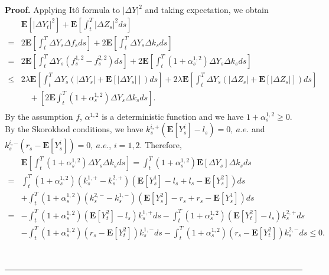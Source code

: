 \documentclass[10pt]{article}%
\numberwithin{equation}{section}
\newenvironment{proof}[1][Proof]{\noindent \textbf{#1.} }{\  \rule{0.5em}{0.5em}}
\def \E{\mathbf{E}}
\begin{document}
\begin{proof}
    Applying It\^o formula to $\left|\Delta Y \right|^2$ and taking expectation, we obtain 
    \begin{equation}
    \begin{split}
      & \mathbf{E}\left[\left|\Delta Y_t\right|^2\right]+\mathbf{E}\left[\int_{t}^{T}\left|\Delta Z_s\right|^2ds\right]\\
      =&2\mathbf{E}\left[\int_{t}^{T}\Delta Y_s \Delta f_s ds\right] +2\mathbf{E}\left[\int_{t}^{T}\Delta Y_s \Delta k_s ds\right]\\
      =&2\mathbf{E}\left[\int_{t}^{T}\Delta Y_s(f_s^{1,2}-f_{s}^{2,2})ds\right]+2\mathbf{E}\left[\int_{t}^{T}(1+\alpha^{1,2}_s)\Delta Y_s \Delta k_s ds\right]\\
      \leq & 2\lambda\mathbf{E}\left[\int_{t}^{T}\Delta Y_s(\left|\Delta Y_s \right|+\mathbf{E}[\left|\Delta Y_s\right|])ds\right]+2\lambda\mathbf{E}\left[\int_{t}^{T}\Delta Y_s(\left|\Delta Z_s\right|+\mathbf{E}[\left|\Delta Z_s\right|])ds\right]\\
      &\quad +\left[2\mathbf{E}\int_{t}^{T}(1+\alpha^{1,2}_s)\Delta Y_s \Delta k_s ds\right].\\
    \end{split}
    \end{equation}
    By the assumption $f$, $\alpha^{1,2}$ is a deterministic function and we have $1+\alpha^{1,2}_s\geq 0$. By the Skorokhod conditions, we have $k^{i,+}_s(\mathbf{E}[Y^i_s]-l_s)=0, \ a.e.$ and $k^{i,-}_s(r_s-\mathbf{E}[Y^i_s])=0, \ a.e.$, $i=1,2$.   Therefore,
  \begin{equation*}
      \begin{split}
          &\E\left[\int_t^T(1+\alpha_s^{1,2})\Delta Y_s \Delta k_s ds\right] =\int_t^T(1+\alpha_s^{1,2})\E\left[\Delta Y_s\right] \Delta k_sds\\
          =&\int_{t}^{T}(1+\alpha_s^{1,2})(k_s^{1,+}-k_s^{2,+})(\mathbf{E}[Y^1_s]-l_s+l_s-\mathbf{E}[Y^2_s])ds \\
           &+\int_{t}^{T}(1+\alpha_s^{1,2})(k_s^{2,-}-k_s^{1,-})(\mathbf{E}[Y^2_s]-r_s+r_s-\mathbf{E}[Y^1_s])ds \\
           =&-\int_{t}^{T}(1+\alpha_s^{1,2})(\mathbf{E}[Y^2_t]-l_s)k_s^{1,+}ds-\int_{t}^{T}(1+\alpha_s^{1,2})(\mathbf{E}[Y^2_t]-l_s)k_s^{2,+}ds\\
           &-\int_{t}^{T}(1+\alpha_s^{1,2})(r_s-\mathbf{E}[Y^2_t])k_s^{1,-}ds-\int_{t}^{T}(1+\alpha_s^{1,2})(r_s-\mathbf{E}[Y^2_t])k_s^{2,-}ds\leq 0.
      \end{split}
  \end{equation*}

\end{proof}
\end{document}
